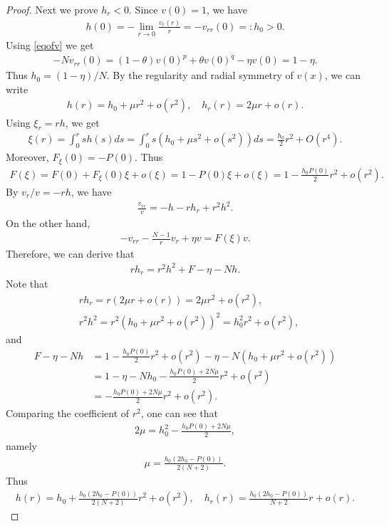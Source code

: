 \documentclass[10pt,a4paper]{amsart}
\begin{document}
\begin{proof}
		Next we prove $h_r < 0$. Since $v(0) = 1$, we have
		\begin{align*}
			h(0) = - \lim_{r \to 0}\frac{v_r(r)}{r} = -v_{rr}(0) =: h_0 > 0.
		\end{align*}
		Using \eqref{eqofv} we get
		\begin{align*}
			-N v_{rr}(0) = (1-\theta)v(0)^{p} + \theta v(0)^{q} - \eta v(0) = 1 - \eta.
		\end{align*}
		Thus $h_0 = (1-\eta)/N$. By the regularity and radial symmetry of $v(x)$, we can write
		\begin{align*}
			h(r) = h_0 + \mu r^2 + o(r^2), \quad h_r(r) = 2\mu r + o(r).
		\end{align*}
		Using $\xi_r = rh$, we get
		\begin{align*}
			\xi(r) = \int_0^r sh(s)ds = \int_0^r s\left(h_0 + \mu s^2 + o(s^2)\right)ds = \frac{h_0}{2}r^2 + O(r^4).
		\end{align*}
		Moreover, $F_\xi(0) = -P(0)$. Thus
		\begin{align*}
			F(\xi) = F(0) + F_\xi(0)\xi + o(\xi) = 1 - P(0)\xi  + o(\xi) = 1 - \frac{h_0P(0)}{2}r^2 + o(r^2).
		\end{align*}
		By $v_r/v = -rh$, we have
		\begin{align*}
			\frac{v_{rr}}{v} = -h - rh_r + r^2h^2.
		\end{align*}
		On the other hand,
		\begin{align*}
			-v_{rr} - \frac{N-1}{r}v_r + \eta v = F(\xi)v.
		\end{align*}
		Therefore, we can derive that
		\begin{align} \label{eqofh_r}
			rh_r = r^2h^2 + F -\eta - Nh.
		\end{align}
		Note that
		\begin{align*}
			& rh_r = r(2\mu r + o(r)) = 2\mu r^2 + o(r^2), \\
			& r^2h^2 = r^2(h_0 + \mu r^2 + o(r^2))^2 = h_0^2 r^2 + o(r^2),
		\end{align*}
		and
		\begin{align*}
			F - \eta - Nh & = 1 - \frac{h_0P(0)}{2}r^2 + o(r^2) - \eta - N (h_0 + \mu r^2 + o(r^2)) \\
			& = 1 - \eta - Nh_0 - \frac{h_0P(0) + 2N\mu}{2}r^2 + o(r^2) \\
			& = - \frac{h_0P(0) + 2N\mu}{2}r^2 + o(r^2).
		\end{align*}
		Comparing the coefficient of $r^2$, one can see that
		\begin{align*}
			2\mu = h_0^2 - \frac{h_0P(0) + 2N\mu}{2},
		\end{align*}
		namely
		\begin{align*}
			\mu = \frac{h_0(2h_0 - P(0))}{2(N+2)}.
		\end{align*}
		Thus
		\begin{align} \label{eqextending}
			h(r) = h_0 + \frac{h_0(2h_0 - P(0))}{2(N+2)} r^2 + o(r^2), \quad h_r(r) = \frac{h_0(2h_0 - P(0))}{N+2} r + o(r).
		\end{align}


\end{proof}
\end{document}
